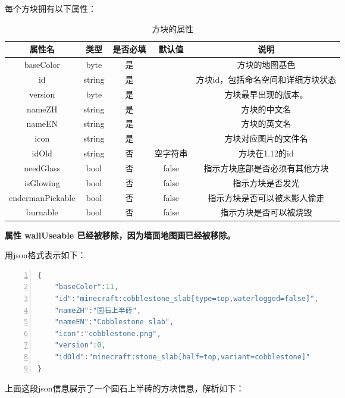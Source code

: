 \documentclass[UTF8]{ctexart}
\begin{document}
每个方块拥有以下属性：
\begin{table}[h]
    \centering
    \caption{方块的属性}
    \begin{tabular}{ccccc}
        \hline
        属性名           & 类型   & 是否必填 & 默认值   & 说明                               \\ \hline
        baseColor        & byte   & 是       &          & 方块的地图基色                     \\
        id               & string & 是       &          & 方块id，包括命名空间和详细方块状态 \\
        version          & byte   & 是       &          & 方块最早出现的版本。               \\
        nameZH           & string & 是       &          & 方块的中文名                       \\
        nameEN           & string & 是       &          & 方块的英文名                       \\
        icon             & string & 是       &          & 方块对应图片的文件名               \\
        idOld            & string & 否       & 空字符串 & 方块在1.12的id                     \\
        needGlass        & bool   & 否       & false    & 指示方块底部是否必须有其他方块     \\
        isGlowing        & bool   & 否       & false    & 指示方块是否发光                   \\
        endermanPickable & bool   & 否       & false    & 指示方块是否可以被末影人偷走       \\
        burnable         & bool   & 否       & false    & 指示方块是否可以被烧毁             \\
        \hline
    \end{tabular}
\end{table}

\textbf{属性 wallUseable 已经被移除，因为墙面地图画已经被移除。}

\clearpage
用json格式表示如下：
\begin{lstlisting}[language = C++, numbers=left, 
    numberstyle=\tiny,keywordstyle=\color{blue!70},
    commentstyle=\color{red!50!green!50!blue!50},frame=shadowbox,
    rulesepcolor=\color{red!20!green!20!blue!20},basicstyle=\ttfamily]
{
    "baseColor":11,
    "id":"minecraft:cobblestone_slab[type=top,waterlogged=false]",
    "nameZH":"圆石上半砖",
    "nameEN":"Cobblestone slab",
    "icon":"cobblestone.png",
    "version":0,
    "idOld":"minecraft:stone_slab[half=top,variant=cobblestone]"
}
    \end{lstlisting}
上面这段json信息展示了一个圆石上半砖的方块信息，解析如下：
\end{document}
